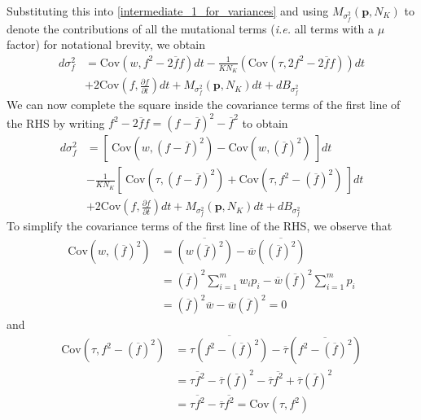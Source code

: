 Substituting this into \eqref{intermediate_1_for_variances} and using $M_{\sigma^2_f}(\mathbf{p},N_K)$ to denote the contributions of all the mutational terms (\emph{i.e.} all terms with a $\mu$ factor) for notational brevity, we obtain
\begin{equation}
\begin{aligned}
d\sigma^2_{f} &= \textrm{Cov}(w,f^2 - 2\overline{f}f)dt - \frac{1}{KN_K}\left(\textrm{Cov}(\tau,2f^2 - 2\overline{f}f)\right)dt\\
&+ 2\textrm{Cov}\left(f, \frac{\partial f}{\partial t}\right)dt + M_{\sigma^2_f}(\mathbf{p},N_K)dt + dB_{\sigma^2_{f}}
\end{aligned}
\end{equation}
We can now complete the square inside the covariance terms of the first line of the RHS by writing $f^2 - 2\overline{f}f = (f - \overline{f})^2 - \overline{f}^2$ to obtain
\begin{equation}
\label{intermediate_2_for_variances}
\begin{aligned}
d\sigma^2_{f} &= \left[ \ \textrm{Cov}\left(w,(f - \overline{f})^2\right)-\textrm{Cov}\left(w, {\left(\overline{f}\right)}^2\right) \ \right]dt\\[12pt]
&- \frac{1}{KN_K}\left[ \ \textrm{Cov}\left(\tau,(f - \overline{f})^2\right) + \textrm{Cov}\left(\tau,f^2 - {\left(\overline{f}\right)}^2\right) \ \right]dt\\[12pt]
& + 2\textrm{Cov}\left(f, \frac{\partial f}{\partial t}\right)dt + M_{\sigma^2_f}(\mathbf{p},N_K)dt + dB_{\sigma^2_{f}}
\end{aligned}
\end{equation}
To simplify the covariance terms of the first line of the RHS, we observe that
\begin{align}
\textrm{Cov}\left(w, {\left(\overline{f}\right)}^2\right) &= \overline{\left(w{\left(\overline{f}\right)}^2\right)} - \overline{w}\overline{\left({\left(\overline{f}\right)}^2\right)}\nonumber\\
&= {\left(\overline{f}\right)}^2\sum\limits_{i=1}^{m}w_ip_i - \overline{w}{\left(\overline{f}\right)}^2\sum\limits_{i=1}^{m}p_i\nonumber\\
&= {\left(\overline{f}\right)}^2\overline{w} - \overline{w}{\left(\overline{f}\right)}^2 = 0\label{cov_term_1_for_variances}
\end{align}
and
\begin{align}
\textrm{Cov}\left(\tau,f^2 - {\left(\overline{f}\right)}^2\right) &= \overline{\tau\left(f^2 - {\left(\overline{f}\right)}^2\right)} - \overline{\tau}\left(\overline{f^2 - {\left(\overline{f}\right)}^2}\right)\nonumber\\
&= \overline{\tau f^2} - \overline{\tau}{\left(\overline{f}\right)}^2  - \overline{\tau}\overline{f^2} + \overline{\tau}{\left(\overline{f}\right)}^2\nonumber\\
&=\overline{\tau f^2} - \overline{\tau}\overline{f^2} = \textrm{Cov}(\tau,f^2)\label{cov_term_2_for_variances}
\end{align}

